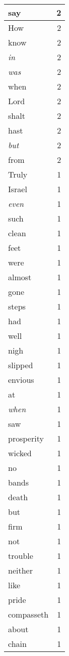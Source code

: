 \begin{center}
\begin{longtable}{l|r}
say & 2 \\ \hline
How & 2 \\ \hline
know & 2 \\ \hline
\emph{in} & 2 \\ \hline
\emph{was} & 2 \\ \hline
when & 2 \\ \hline
Lord & 2 \\ \hline
shalt & 2 \\ \hline
hast & 2 \\ \hline
\emph{but} & 2 \\ \hline
from & 2 \\ \hline
Truly & 1 \\ \hline
Israel & 1 \\ \hline
\emph{even} & 1 \\ \hline
such & 1 \\ \hline
clean & 1 \\ \hline
feet & 1 \\ \hline
were & 1 \\ \hline
almost & 1 \\ \hline
gone & 1 \\ \hline
steps & 1 \\ \hline
had & 1 \\ \hline
well & 1 \\ \hline
nigh & 1 \\ \hline
slipped & 1 \\ \hline
envious & 1 \\ \hline
at & 1 \\ \hline
\emph{when} & 1 \\ \hline
saw & 1 \\ \hline
prosperity & 1 \\ \hline
wicked & 1 \\ \hline
no & 1 \\ \hline
bands & 1 \\ \hline
death & 1 \\ \hline
but & 1 \\ \hline
firm & 1 \\ \hline
not & 1 \\ \hline
trouble & 1 \\ \hline
neither & 1 \\ \hline
like & 1 \\ \hline
pride & 1 \\ \hline
compasseth & 1 \\ \hline
about & 1 \\ \hline
chain & 1 \\ \hline

\end{longtable}
\end{center}
